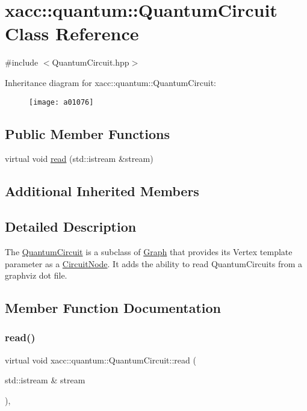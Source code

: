 \hypertarget{a01076}{}\section{xacc\+:\+:quantum\+:\+:Quantum\+Circuit Class Reference}
\label{a01076}


{\ttfamily \#include $<$Quantum\+Circuit.\+hpp$>$}

Inheritance diagram for xacc\+:\+:quantum\+:\+:Quantum\+Circuit\+:\begin{figure}[H]
\begin{center}
\leavevmode
\texttt{[image: a01076]}
\end{center}
\end{figure}
\subsection*{Public Member Functions}
\begin{DoxyCompactItemize}
\item 
virtual void \hyperlink{a01076_af7a7f4a487d493fe8a4ed1f76cefd731}{read} (std\+::istream \&stream)
\end{DoxyCompactItemize}
\subsection*{Additional Inherited Members}


\subsection{Detailed Description}
The \hyperlink{a01076}{Quantum\+Circuit} is a subclass of \hyperlink{a01184}{Graph} that provides its Vertex template parameter as a \hyperlink{a01000}{Circuit\+Node}. It adds the ability to read Quantum\+Circuits from a graphviz dot file. 

\subsection{Member Function Documentation}
\mbox{\label{a01076_af7a7f4a487d493fe8a4ed1f76cefd731}} 
\subsubsection{\texorpdfstring{read()}{read()}}
{\footnotesize\ttfamily virtual void xacc\+::quantum\+::\+Quantum\+Circuit\+::read (\begin{DoxyParamCaption}\item[{std\+::istream \&}]{stream }\end{DoxyParamCaption})\hspace{0.3cm}{\ttfamily [inline]}, {\ttfamily [virtual]}}


